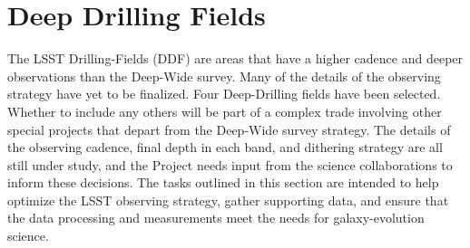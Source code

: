 \section{Deep Drilling Fields}\label{sec:tasks:ddf}  

The LSST Drilling-Fields (DDF) are areas that have a higher cadence and deeper observations than the Deep-Wide survey. Many of the details of the observing strategy have yet to be finalized. Four Deep-Drilling fields have been selected. Whether to include any others will be part of a complex trade involving other special projects that depart from the Deep-Wide survey strategy. The details of the observing cadence, final depth in each band, and dithering strategy are all still under study, and the Project needs input from the science collaborations to inform these decisions. The tasks outlined in this section are intended to help optimize the LSST observing strategy, gather supporting data, and ensure that the data processing and measurements  meet the needs for galaxy-evolution science.

